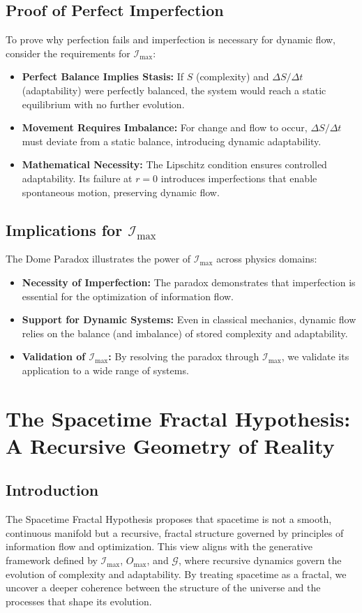 \documentclass[12pt]{article}
\begin{document}
\subsection{Proof of Perfect Imperfection}
To prove why perfection fails and imperfection is necessary for dynamic flow, consider the requirements for $\mathcal{I}_{\text{max}}$:
\begin{itemize}
    \item \textbf{Perfect Balance Implies Stasis:} If $S$ (complexity) and $\Delta S / \Delta t$ (adaptability) were perfectly balanced, the system would reach a static equilibrium with no further evolution.
    \item \textbf{Movement Requires Imbalance:} For change and flow to occur, $\Delta S / \Delta t$ must deviate from a static balance, introducing dynamic adaptability.
    \item \textbf{Mathematical Necessity:} The Lipschitz condition ensures controlled adaptability. Its failure at $r = 0$ introduces imperfections that enable spontaneous motion, preserving dynamic flow.
\end{itemize}

\subsection{Implications for $\mathcal{I}_{\text{max}}$}
The Dome Paradox illustrates the power of $\mathcal{I}_{\text{max}}$ across physics domains:
\begin{itemize}
    \item \textbf{Necessity of Imperfection:} The paradox demonstrates that imperfection is essential for the optimization of information flow.
    \item \textbf{Support for Dynamic Systems:} Even in classical mechanics, dynamic flow relies on the balance (and imbalance) of stored complexity and adaptability.
    \item \textbf{Validation of $\mathcal{I}_{\text{max}}$:} By resolving the paradox through $\mathcal{I}_{\text{max}}$, we validate its application to a wide range of systems.
\end{itemize}


\section{The Spacetime Fractal Hypothesis: A Recursive Geometry of Reality}

\subsection{Introduction}
The Spacetime Fractal Hypothesis proposes that spacetime is not a smooth, continuous manifold but a recursive, fractal structure governed by principles of information flow and optimization. This view aligns with the generative framework defined by \(\mathcal{I}_{\text{max}}\), \(O_{\text{max}}\), and \(\mathcal{G}\), where recursive dynamics govern the evolution of complexity and adaptability. By treating spacetime as a fractal, we uncover a deeper coherence between the structure of the universe and the processes that shape its evolution.
\end{document}
